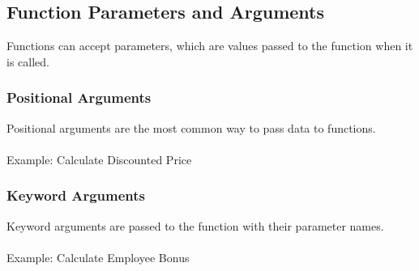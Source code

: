 \documentclass[
  letterpaper,
  DIV=11,
  numbers=noendperiod]{scrreprt}
\makeatletter
\let\oldparagraph\paragraph
\renewcommand{\paragraph}{
    \@ifstar
      \xxxParagraphStar
      \xxxParagraphNoStar
  }
\newcommand{\xxxParagraphStar}[1]{\oldparagraph*{#1}\mbox{}}
\newcommand{\xxxParagraphNoStar}[1]{\oldparagraph{#1}\mbox{}}
\newenvironment{Shaded}{\begin{snugshade}}{\end{snugshade}}
\newcommand{\BuiltInTok}[1]{\textcolor[rgb]{0.00,0.23,0.31}{#1}}
\newcommand{\CommentTok}[1]{\textcolor[rgb]{0.37,0.37,0.37}{#1}}
\newcommand{\ControlFlowTok}[1]{\textcolor[rgb]{0.00,0.23,0.31}{\textbf{#1}}}
\newcommand{\DecValTok}[1]{\textcolor[rgb]{0.68,0.00,0.00}{#1}}
\newcommand{\FloatTok}[1]{\textcolor[rgb]{0.68,0.00,0.00}{#1}}
\newcommand{\KeywordTok}[1]{\textcolor[rgb]{0.00,0.23,0.31}{\textbf{#1}}}
\newcommand{\NormalTok}[1]{\textcolor[rgb]{0.00,0.23,0.31}{#1}}
\newcommand{\OperatorTok}[1]{\textcolor[rgb]{0.37,0.37,0.37}{#1}}
\newcommand{\SpecialCharTok}[1]{\textcolor[rgb]{0.37,0.37,0.37}{#1}}
\newcommand{\SpecialStringTok}[1]{\textcolor[rgb]{0.13,0.47,0.30}{#1}}
\makeatother
\begin{document}
\subsection{Function Parameters and
Arguments}\label{function-parameters-and-arguments}

Functions can accept parameters, which are values passed to the function
when it is called.

\subsubsection{Positional Arguments}\label{positional-arguments}

Positional arguments are the most common way to pass data to functions.

\paragraph{Example: Calculate Discounted
Price}\label{example-calculate-discounted-price}

\begin{Shaded}
\end{Shaded}

\subsubsection{Keyword Arguments}\label{keyword-arguments}

Keyword arguments are passed to the function with their parameter names.

\paragraph{Example: Calculate Employee
Bonus}\label{example-calculate-employee-bonus}
\end{document}
